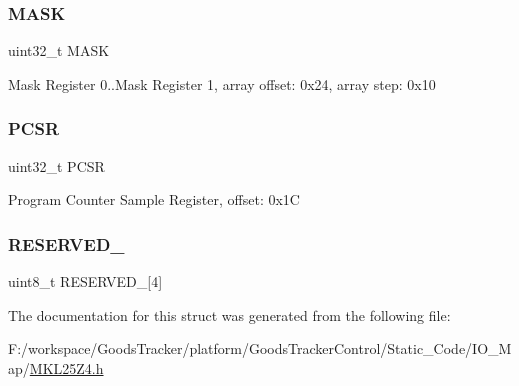 \subsubsection{\texorpdfstring{M\+A\+SK}{MASK}}
{\footnotesize\ttfamily uint32\+\_\+t M\+A\+SK}

Mask Register 0..Mask Register 1, array offset\+: 0x24, array step\+: 0x10 \mbox{\label{struct_d_w_t___mem_map_a631b6ac4a2a7ea845ce82f685d1e0d97}} 
\subsubsection{\texorpdfstring{P\+C\+SR}{PCSR}}
{\footnotesize\ttfamily uint32\+\_\+t P\+C\+SR}

Program Counter Sample Register, offset\+: 0x1C \mbox{\label{struct_d_w_t___mem_map_a3c335221b719dd64f44cd8f400d5d09f}} 
\subsubsection{\texorpdfstring{R\+E\+S\+E\+R\+V\+E\+D\+\_}{RESERVED\_0}}
{\footnotesize\ttfamily uint8\+\_\+t R\+E\+S\+E\+R\+V\+E\+D\+\_\mbox{[}4\mbox{]}}



The documentation for this struct was generated from the following file\+:\begin{DoxyCompactItemize}
\item 
F\+:/workspace/\+Goods\+Tracker/platform/\+Goods\+Tracker\+Control/\+Static\+\_\+\+Code/\+I\+O\+\_\+\+Map/\hyperlink{_m_k_l25_z4_8h}{M\+K\+L25\+Z4.\+h}\end{DoxyCompactItemize}
